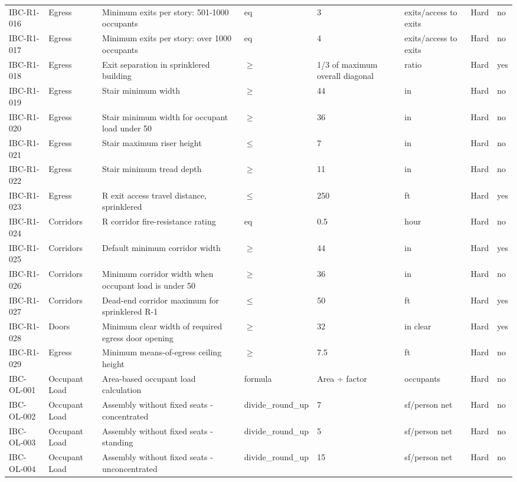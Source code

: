 \documentclass[10pt]{article}
\begin{document}
{\begin{longtable}{p{1.75cm}p{2.0cm}p{4.7cm}p{1.2cm}p{1.5cm}p{1.7cm}p{0.9cm}p{1.1cm}}
IBC-R1-016 & Egress & Minimum exits per story: 501-1000 occupants & eq & 3 & exits/access to exits & Hard & no \\
IBC-R1-017 & Egress & Minimum exits per story: over 1000 occupants & eq & 4 & exits/access to exits & Hard & no \\
IBC-R1-018 & Egress & Exit separation in sprinklered building & $\ge$ & 1/3 of maximum overall diagonal & ratio & Hard & yes \\
IBC-R1-019 & Egress & Stair minimum width & $\ge$ & 44 & in & Hard & no \\
IBC-R1-020 & Egress & Stair minimum width for occupant load under 50 & $\ge$ & 36 & in & Hard & no \\
IBC-R1-021 & Egress & Stair maximum riser height & $\le$ & 7 & in & Hard & no \\
IBC-R1-022 & Egress & Stair minimum tread depth & $\ge$ & 11 & in & Hard & no \\
IBC-R1-023 & Egress & R exit access travel distance, sprinklered & $\le$ & 250 & ft & Hard & yes \\
IBC-R1-024 & Corridors & R corridor fire-resistance rating & eq & 0.5 & hour & Hard & no \\
IBC-R1-025 & Corridors & Default minimum corridor width & $\ge$ & 44 & in & Hard & yes \\
IBC-R1-026 & Corridors & Minimum corridor width when occupant load is under 50 & $\ge$ & 36 & in & Hard & no \\
IBC-R1-027 & Corridors & Dead-end corridor maximum for sprinklered R-1 & $\le$ & 50 & ft & Hard & yes \\
IBC-R1-028 & Doors & Minimum clear width of required egress door opening & $\ge$ & 32 & in clear & Hard & yes \\
IBC-R1-029 & Egress & Minimum means-of-egress ceiling height & $\ge$ & 7.5 & ft & Hard & no \\
IBC-OL-001 & Occupant Load & Area-based occupant load calculation & formula & Area ÷ factor & occupants & Hard & no \\
IBC-OL-002 & Occupant Load & Assembly without fixed seats - concentrated & divide\_round\_up & 7 & sf/person net & Hard & no \\
IBC-OL-003 & Occupant Load & Assembly without fixed seats - standing & divide\_round\_up & 5 & sf/person net & Hard & no \\
IBC-OL-004 & Occupant Load & Assembly without fixed seats - unconcentrated & divide\_round\_up & 15 & sf/person net & Hard & no \\

\end{longtable}}
\end{document}
